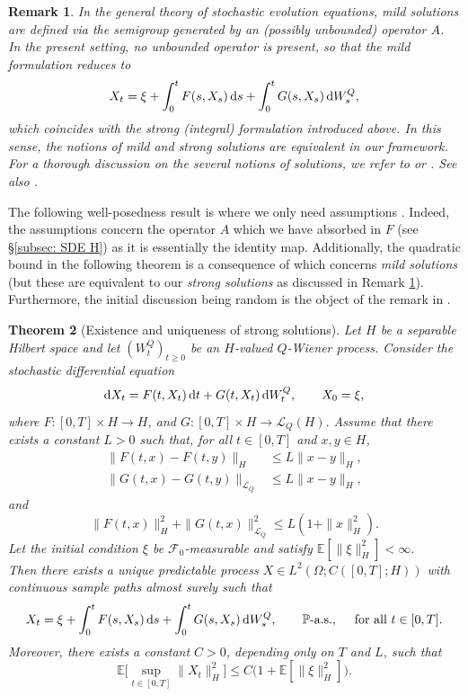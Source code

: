 \documentclass[12pt]{amsart}
\newcommand{\D}[1]{\mbox{\rm #1}}
\newcommand{\dd}{\D{d}}
\numberwithin{equation}{section}
\newtheorem{theorem}{Theorem}[section]
\newtheorem{remark}[theorem]{Remark}
\begin{document}
\begin{remark}\label{rmk:mild}
In the general theory of stochastic evolution equations, mild solutions are defined via the semigroup generated by an (possibly unbounded) operator $A$. \\
In the present setting, no unbounded operator is present, so that the mild formulation reduces to
\[
    X_t = \xi + \int_0^t F(s,X_s)\,\dd s + \int_0^t G(s,X_s)\,\dd W_s^Q,
\]
which coincides with the strong (integral) formulation introduced above. In this sense, the notions of mild and strong solutions are equivalent in our framework. 
For a thorough discussion on the several notions of solutions, we refer to \cite[Item 3 in Remark 4.2.2, page 90]{liu2015stochastic} or \cite[Item 3 in Remark 4.2.2, page 74]{prevot2007concise}. See also \cite[\S1.1]{liu2015stochastic}.
\end{remark}


The following well-posedness result is \cite[Theorem 7.4, page 205]{chow2007stochastic} where we only need assumptions \cite[(C1)-(C2), page 205]{chow2007stochastic}. Indeed, the assumptions \cite[(B1)-(B3), page 198]{chow2007stochastic} concern the operator $A$ which we have absorbed in $F$ (see \S \ref{subsec: SDE H}) as it is essentially the identity map. Additionally, the quadratic bound in the following theorem is a consequence of \cite[Theorem 6.4, page 186]{chow2007stochastic} which concerns \textit{mild solutions} (but these are equivalent to our \textit{strong solutions} as discussed in Remark \ref{rmk:mild}). Furthermore, the initial discussion being random is the object of the remark in \cite[page 191]{chow2007stochastic}. 


\begin{theorem}[Existence and uniqueness of strong solutions]
\label{thm:solution}
Let $H$ be a separable Hilbert space and let $(W_t^Q)_{t\ge0}$ be an $H$-valued $Q$-Wiener process. Consider the stochastic differential equation
\[
    \dd X_t = F(t,X_t)\,\dd t + G(t,X_t)\,\dd W_t^Q, \qquad X_0=\xi,
\]
where $F:[0,T]\times H\to H$, and $G:[0,T]\times H\to \mathscr L_Q(H).$ 
Assume that there exists a constant $L>0$ such that, for all
$t\in[0,T]$ and $x,y\in H$,
\begin{align*}
    \|F(t,x)-F(t,y)\|_H &\le L\|x-y\|_H, \\
    \|G(t,x)-G(t,y)\|_{\mathscr L_Q} &\le L\|x-y\|_H,
\end{align*}
and
\[
    \|F(t,x)\|_H^2 + \|G(t,x)\|_{\mathscr L_Q}^2 \le L(1+\|x\|_H^2).
\]
Let the initial condition $\xi$ be $\mathscr{F}_0$-measurable and satisfy $\mathbb{E}[\|\xi\|_H^2] < \infty.$ \\
Then there exists a unique predictable process $X\in L^2(\Omega;C([0,T];H))$  with continuous sample paths almost surely such that
\[
    X_t = \xi + \int_0^t F(s,X_s)\,\dd s + \int_0^t G(s,X_s)\,\dd W_s^Q, \qquad \mathbb{P}\text{-a.s.}, \quad \text{ for all } t\in[0,T].
\]
Moreover, there exists a constant $C>0$, depending only on $T$ and $L$, such that
\[
    \mathbb{E}\Big[ \sup_{t\in[0,T]} \|X_t\|_H^2 \Big] \le C\Big( 1+\mathbb{E}[\|\xi\|_H^2] \Big).
\]
\end{theorem}
\end{document}
